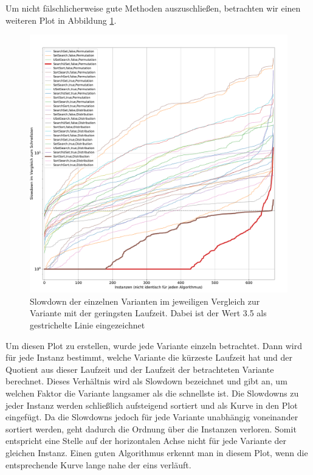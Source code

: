 Um nicht fälschlicherweise \glqq gute\grqq{} Methoden auszuschließen,
betrachten wir einen weiteren Plot in Abbildung \ref{fig:messung_slowdown}. 
\begin{figure}
\centering
	\includegraphics[width = 1\textwidth]{figures/slowdown.pdf}
	\caption[Slowdown der einzelnen Varianten im jeweiligen Vergleich zur Variante mit der geringsten Laufzeit.]
	{Slowdown der einzelnen Varianten im jeweiligen Vergleich zur Variante mit der geringsten Laufzeit. 
	Dabei ist der Wert 3.5 als gestrichelte Linie eingezeichnet}
	\label{fig:messung_slowdown}
\end{figure}
Um diesen Plot zu erstellen, wurde jede Variante einzeln betrachtet.
Dann wird für jede Instanz bestimmt, welche Variante die kürzeste Laufzeit hat und der Quotient
aus dieser Laufzeit und der Laufzeit der betrachteten Variante berechnet. Dieses Verhältnis wird als Slowdown
bezeichnet und gibt an, um welchen Faktor die Variante langsamer als die schnellste ist. Die Slowdowns
zu jeder Instanz werden schließlich aufsteigend sortiert und als Kurve in den Plot eingefügt.
Da die Slowdowns jedoch für jede Variante unabhängig voneinander sortiert werden, geht dadurch 
die Ordnung über die Instanzen verloren. Somit entspricht eine Stelle auf der horizontalen Achse 
nicht für jede Variante der gleichen Instanz. Einen \glqq guten\grqq{} Algorithmus erkennt man in diesem
Plot, wenn die entsprechende Kurve lange nahe der eins verläuft.
\\

